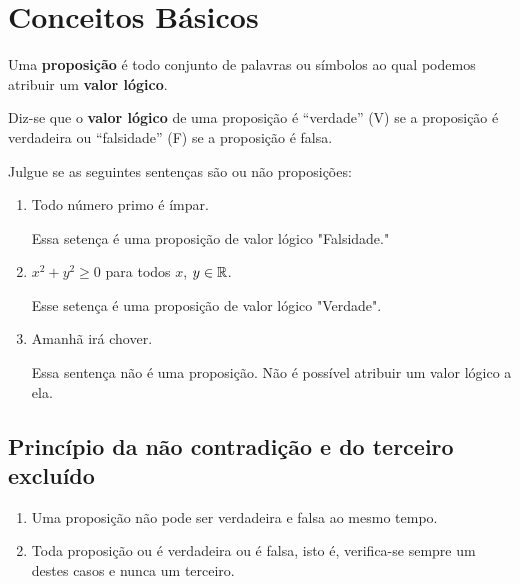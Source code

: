 \chapter{Conceitos Básicos} %
\label{cha:conceitos_basicos}

\begin{definicao}
    Uma \textbf{proposição} é todo conjunto de palavras ou símbolos ao qual podemos atribuir um \textbf{valor lógico}.
\end{definicao}

\begin{definicao}
    Diz-se que o \textbf{valor lógico} de uma proposição é ``verdade'' (V) se a proposição é verdadeira ou ``falsidade'' (F) se a proposição é falsa.
\end{definicao}

\begin{exemplos}
    Julgue se as seguintes sentenças são ou não proposições:
    \begin{enumerate}[label={\arabic*})]
        \item Todo número primo é ímpar.
        \begin{solucao}
            Essa setença é uma proposição de valor lógico "Falsidade."
        \end{solucao}

        \item $x^2 + y^2 \ge 0$ para todos $x$, $y \in \mathbb{R}$.
        \begin{solucao}
            Esse setença é uma proposição de valor lógico "Verdade".
        \end{solucao}

        \item Amanhã irá chover.
        \begin{solucao}
            Essa sentença não é uma proposição. Não é possível atribuir um valor lógico a ela.
        \end{solucao}
    \end{enumerate}

\end{exemplos}

\section{Princípio da não contradição e do terceiro excluído} %
\label{sec:principio_da_nao_contradicao_e_do_3}
\begin{enumerate}[label={\roman*})]
    \item Uma proposição não pode ser verdadeira e falsa ao mesmo tempo.
    \item Toda proposição ou é verdadeira ou é falsa, isto é, verifica-se sempre um destes casos e nunca um terceiro.
\end{enumerate}


